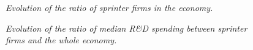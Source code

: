 \documentclass[letterpaper,12pt]{article}
\theoremstyle{definition}
\begin{document}
\begin{figure}[htb]\centering \captionsetup{width=5.8in}
    \caption{\label{fig:CBFirms}\textit{Evolution of the ratio of sprinter firms in the economy.}}
\end{figure}

\begin{figure}[htb]\centering \captionsetup{width=5.8in}
    \caption{\label{fig:RD_spending_rat}\textit{Evolution of the ratio of median R\&D spending between sprinter firms and the whole economy.}}
\end{figure}
\end{document}
